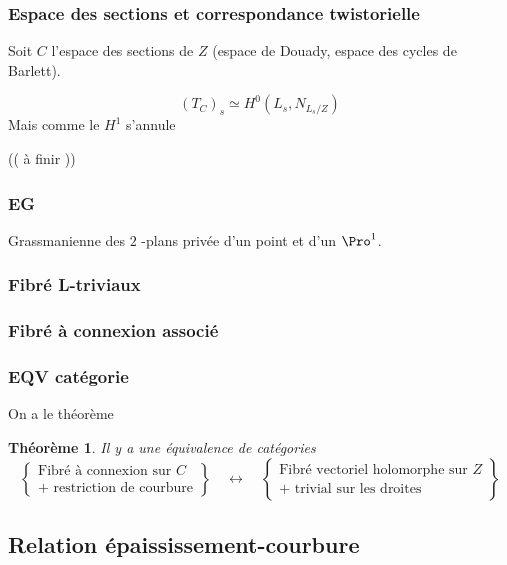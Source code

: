 \documentclass[a4paper]{amsart}
\newtheorem{thm}{Théorème}
\begin{document}
\subsubsection{Espace des sections et correspondance twistorielle}
\label{sec:orgheadline9}
Soit \(C\) l'espace des sections de \(Z\) (espace de Douady, espace des cycles de Barlett).

\[
(T_C)_s \simeq H^0(L_s, N_{L_s/Z})
\]
Mais comme le \(H^1\) s'annule

(( à finir ))

\subsubsection{EG}
\label{sec:orgheadline10}

Grassmanienne des \(2\) -plans privée d'un point et d'un \(\Pro^1\).

\subsubsection{Fibré L-triviaux}
\label{sec:orgheadline11}

\subsubsection{Fibré à connexion associé}
\label{sec:orgheadline12}

\subsubsection{EQV catégorie}
\label{sec:orgheadline13}
On a le théorème
\begin{thm}
Il y a une équivalence de catégories
\begin{equation*}
\left\lbrace
\begin{matrix}
\text{Fibré à connexion sur }C \\
+ \text{ restriction de courbure}
\end{matrix}
\right\rbrace \quad \leftrightarrow \quad \left\lbrace
\begin{matrix}
\text{Fibré vectoriel holomorphe sur }Z\\
+ \text{ trivial sur les droites}
\end{matrix}
\right\rbrace
\end{equation*}
\end{thm}

\subsection{Relation épaississement-courbure}
\label{sec:orgheadline17}
\end{document}
